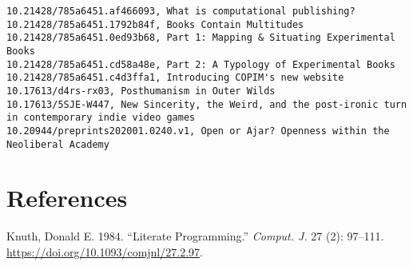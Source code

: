 \documentclass[
  letterpaper,
  DIV=11,
  numbers=noendperiod]{scrreprt}
\newlength{\cslhangindent}
\newlength{\cslentryspacingunit} %
\newenvironment{CSLReferences}[2] %
 {%
  \setlength{\parindent}{0pt}
  \ifodd #1
  \let\oldpar\par
  \def\par{\hangindent=\cslhangindent\oldpar}
  \fi
  \setlength{\parskip}{#2\cslentryspacingunit}
 }%
 {}
\begin{document}
\begin{verbatim}
10.21428/785a6451.af466093, What is computational publishing?
10.21428/785a6451.1792b84f, Books Contain Multitudes
10.21428/785a6451.0ed93b68, Part 1: Mapping & Situating Experimental Books
10.21428/785a6451.cd58a48e, Part 2: A Typology of Experimental Books
10.21428/785a6451.c4d3ffa1, Introducing COPIM's new website
10.17613/d4rs-rx03, Posthumanism in Outer Wilds
10.17613/5SJE-W447, New Sincerity, the Weird, and the post-ironic turn in contemporary indie video games
10.20944/preprints202001.0240.v1, Open or Ajar? Openness within the Neoliberal Academy
\end{verbatim}


\hypertarget{references}{%
\chapter*{References}\label{references}}


\hypertarget{refs}{}
\begin{CSLReferences}{1}{0}
\leavevmode{}%
Knuth, Donald E. 1984. {``Literate Programming.''} \emph{Comput. J.} 27
(2): 97--111. \url{https://doi.org/10.1093/comjnl/27.2.97}.

\end{CSLReferences}
\end{document}

